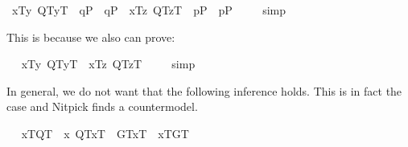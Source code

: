 \begin{isabellebody}
\ {\isachardoublequoteopen}{\isacharbrackleft}{\isasymlbrace}x\isactrlsup T{\isacharcomma}{\isacharparenleft}\isactrlbold {\isasymlambda}y{\isachardot}\ {\isacharparenleft}{\isasymlparr}Q\isactrlsup T{\isacharcomma}y\isactrlsup T{\isasymrparr}\ \isactrlbold {\isasymand}\ {\isacharparenleft}q\isactrlsup P\ \isactrlbold {\isasymor}\ \isactrlbold {\isasymnot}q\isactrlsup P{\isacharparenright}{\isacharparenright}{\isacharparenright}{\isasymrbrace}\ \isactrlbold {\isasymrightarrow}\ {\isasymlbrace}x\isactrlsup T{\isacharcomma}{\isacharparenleft}\isactrlbold {\isasymlambda}z{\isachardot}\ {\isacharparenleft}{\isasymlparr}Q\isactrlsup T{\isacharcomma}z\isactrlsup T{\isasymrparr}\ \isactrlbold {\isasymand}\ {\isacharparenleft}p\isactrlsup P\ \isactrlbold {\isasymor}\ \isactrlbold {\isasymnot}p\isactrlsup P{\isacharparenright}{\isacharparenright}{\isacharparenright}{\isasymrbrace}{\isacharbrackright}\ {\isacharequal}\ {\isasymtop}{\isachardoublequoteclose}%
\isadelimproof
\ %
\endisadelimproof
%
\isatagproof
{}\isamarkupfalse%
\ simp\ \isamarkupfalse%
%
\endisatagproof
{\isafoldproof}%
%
\isadelimproof
%
\endisadelimproof
%
\begin{isamarkuptext}%
This is because we also can prove:%
\end{isamarkuptext}\isamarkuptrue%
\ \isamarkupfalse%
\ {\isachardoublequoteopen}{\isacharbrackleft}{\isasymlbrace}x\isactrlsup T{\isacharcomma}{\isacharparenleft}\isactrlbold {\isasymlambda}y{\isachardot}\ {\isasymlparr}Q\isactrlsup T{\isacharcomma}y\isactrlsup T{\isasymrparr}{\isacharparenright}{\isasymrbrace}\ \isactrlbold {\isasymrightarrow}\ {\isasymlbrace}x\isactrlsup T{\isacharcomma}{\isacharparenleft}\isactrlbold {\isasymlambda}z{\isachardot}\ {\isasymlparr}Q\isactrlsup T{\isacharcomma}z\isactrlsup T{\isasymrparr}{\isacharparenright}{\isasymrbrace}{\isacharbrackright}\ {\isacharequal}\ {\isasymtop}{\isachardoublequoteclose}%
\isadelimproof
\ %
\endisadelimproof
%
\isatagproof
{}\isamarkupfalse%
\ simp\ \isamarkupfalse%
%
\endisatagproof
{\isafoldproof}%
%
\isadelimproof
%
\endisadelimproof
%
\begin{isamarkuptext}%
In general, we do not want that the following inference holds. This is in fact the 
  case and Nitpick finds a countermodel.%
\end{isamarkuptext}\isamarkuptrue%
\ \isamarkupfalse%
\ {\isachardoublequoteopen}{\isacharbrackleft}{\isacharparenleft}{\isasymlbrace}x\isactrlsup T{\isacharcomma}Q\isactrlsup T{\isasymrbrace}\ \isactrlbold {\isasymand}\ {\isacharparenleft}\isactrlbold {\isasymbox}{\isacharparenleft}\isactrlbold {\isasymforall}x{\isachardot}\ {\isacharparenleft}{\isasymlparr}Q\isactrlsup T{\isacharcomma}x\isactrlsup T{\isasymrparr}\ \isactrlbold {\isasymrightarrow}\ {\isasymlparr}G\isactrlsup T{\isacharcomma}x\isactrlsup T{\isasymrparr}{\isacharparenright}{\isacharparenright}{\isacharparenright}{\isacharparenright}\ \isactrlbold {\isasymrightarrow}\ {\isasymlbrace}x\isactrlsup T{\isacharcomma}G\isactrlsup T{\isasymrbrace}{\isacharbrackright}\ {\isacharequal}\ {\isasymtop}{\isachardoublequoteclose}%

\end{isabellebody}
